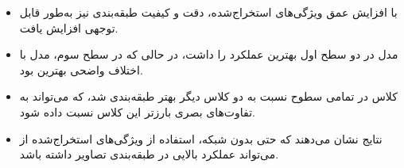 \documentclass[a4paper,12pt]{article}
\begin{document}
\begin{itemize}
	\item با افزایش عمق ویژگی‌های استخراج‌شده، دقت و کیفیت طبقه‌بندی نیز به‌طور قابل توجهی افزایش یافت.
	\item مدل  در دو سطح اول بهترین عملکرد را داشت، در حالی که در سطح سوم، مدل  با اختلاف واضحی بهترین بود.
	\item کلاس  در تمامی سطوح نسبت به دو کلاس دیگر بهتر طبقه‌بندی شد، که می‌تواند به تفاوت‌های بصری بارزتر این کلاس نسبت داده شود.
	\item نتایج نشان می‌دهند که حتی بدون  شبکه، استفاده از ویژگی‌های استخراج‌شده از  می‌تواند عملکرد بالایی در طبقه‌بندی تصاویر داشته باشد.
\end{itemize}
\end{document}
